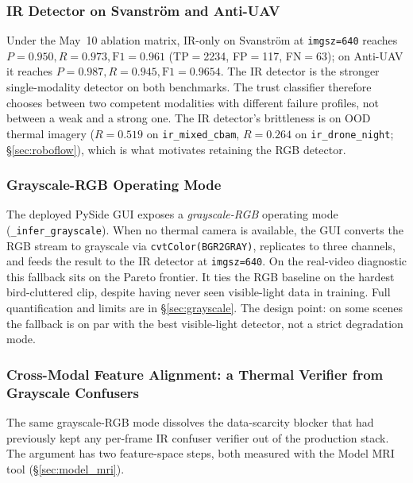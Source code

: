 \subsubsection{IR Detector on Svanstr\"om and Anti-UAV}

Under the May~10 ablation matrix, IR-only on Svanstr\"om at \texttt{imgsz=640} reaches $P=0.950, R=0.973, \text{F1}=0.961$ (TP$=$2234, FP$=$117, FN$=$63); on Anti-UAV it reaches $P=0.987, R=0.945, \text{F1}=0.9654$. The IR detector is the stronger single-modality detector on both benchmarks. The trust classifier therefore chooses between two competent modalities with different failure profiles, not between a weak and a strong one. The IR detector's brittleness is on OOD thermal imagery ($R=0.519$ on \texttt{ir\_mixed\_cbam}, $R=0.264$ on \texttt{ir\_drone\_night}; \S\ref{sec:roboflow}), which is what motivates retaining the RGB detector.

\subsubsection{Grayscale-RGB Operating Mode}
\label{sec:ir_grayscale_mode}

The deployed PySide GUI exposes a \emph{grayscale-RGB} operating mode (\texttt{\_infer\_grayscale}). When no thermal camera is available, the GUI converts the RGB stream to grayscale via \texttt{cvtColor(BGR2GRAY)}, replicates to three channels, and feeds the result to the IR detector at \texttt{imgsz=640}. On the real-video diagnostic this fallback sits on the Pareto frontier. It ties the RGB baseline on the hardest bird-cluttered clip, despite having never seen visible-light data in training. Full quantification and limits are in \S\ref{sec:grayscale}. The design point: on some scenes the fallback is on par with the best visible-light detector, not a strict degradation mode.

\subsubsection{Cross-Modal Feature Alignment: a Thermal Verifier from Grayscale Confusers}
\label{sec:ir_xmodal_verifier}

The same grayscale-RGB mode dissolves the data-scarcity blocker that had previously kept any per-frame IR confuser verifier out of the production stack. The argument has two feature-space steps, both measured with the Model MRI tool (\S\ref{sec:model_mri}).

